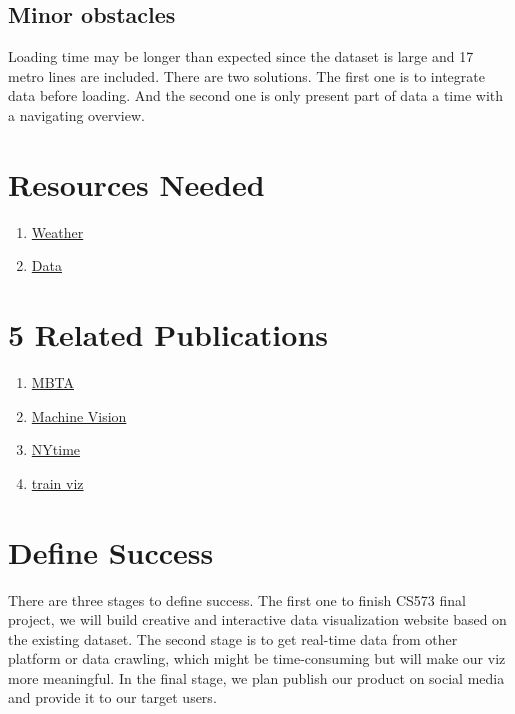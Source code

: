 \documentclass{proc}
\begin{document}
\subsection{Minor obstacles}
Loading time may be longer than expected since the dataset is large and 17 metro lines are included. There are two solutions. The first one is to integrate data before loading. And the second one is only present part of data a time with a navigating overview.

\section{Resources Needed}
\begin{enumerate}
	\item \href{https://www.wunderground.com/history/daily/ZSSS/}{Weather}
	\item \href{https://github.com/jeevanyue/metro}{Data}
\end{enumerate}


\section{5 Related Publications}
\begin{enumerate}
	\item \href{http://mbtaviz.github.io/}{MBTA}
	\item \href{http://clome.info/work/machine-visions/}{Machine Vision}
	\item \href{https://www.nytimes.com/interactive/2019/01/26/opinion/sunday/paths-to-congress.html}{NYtime}
	\item \href{http://tulpinteractive.com/on-time-every-time/}{train viz}

	
\end{enumerate}


\section{Define Success}
There are three stages to define success. The first one to finish CS573 final project, we will build creative and interactive data visualization website based on the existing dataset. The second stage is to get real-time data from other platform or data crawling, which might be time-consuming but will make our viz more meaningful. In the final stage, we plan publish our product on social media and provide it to our target users.



\end{document}
